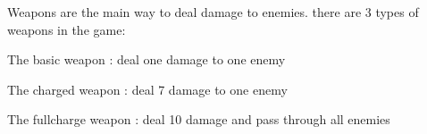 Weapons are the main way to deal damage to enemies. there are 3 types of weapons in the game\+:
\begin{DoxyItemize}
\item The basic weapon \+: deal one damage to one enemy
\item The charged weapon \+: deal 7 damage to one enemy
\item The fullcharge weapon \+: deal 10 damage and pass through all enemies 
\end{DoxyItemize}